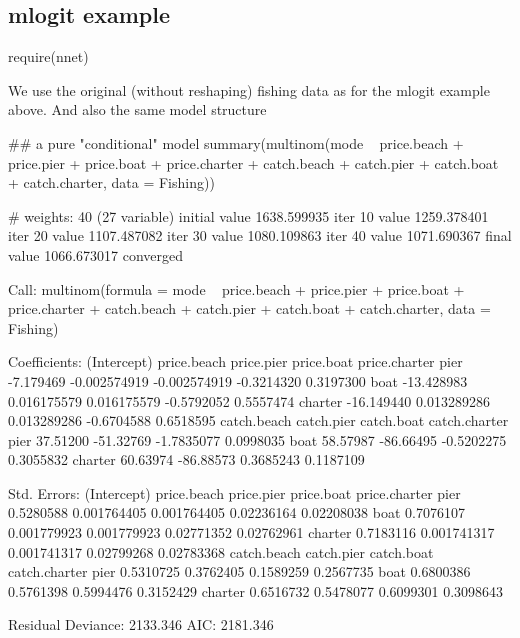\documentclass[a4paper,twoside]{tufte-book}\usepackage[]{graphicx}\usepackage[]{color}
\begin{document}
\begin{appendices}
\subsection{mlogit example}

\begin{Schunk}
\begin{Sinput}
require(nnet)
\end{Sinput}
\end{Schunk}

We use the original (without reshaping) fishing data as for the mlogit example above. 
And also the same model structure

\begin{Schunk}
\begin{Sinput}
## a pure "conditional" model
summary(multinom(mode ~ price.beach + price.pier + price.boat + price.charter + 
                   catch.beach + catch.pier + catch.boat + catch.charter, data = Fishing))
\end{Sinput}
\begin{Soutput}
# weights:  40 (27 variable)
initial  value 1638.599935 
iter  10 value 1259.378401
iter  20 value 1107.487082
iter  30 value 1080.109863
iter  40 value 1071.690367
final  value 1066.673017 
converged
\end{Soutput}
\begin{Soutput}
Call:
multinom(formula = mode ~ price.beach + price.pier + price.boat + 
    price.charter + catch.beach + catch.pier + catch.boat + catch.charter, 
    data = Fishing)

Coefficients:
        (Intercept)  price.beach   price.pier price.boat price.charter
pier      -7.179469 -0.002574919 -0.002574919 -0.3214320     0.3197300
boat     -13.428983  0.016175579  0.016175579 -0.5792052     0.5557474
charter  -16.149440  0.013289286  0.013289286 -0.6704588     0.6518595
        catch.beach catch.pier catch.boat catch.charter
pier       37.51200  -51.32769 -1.7835077     0.0998035
boat       58.57987  -86.66495 -0.5202275     0.3055832
charter    60.63974  -86.88573  0.3685243     0.1187109

Std. Errors:
        (Intercept) price.beach  price.pier price.boat price.charter
pier      0.5280588 0.001764405 0.001764405 0.02236164    0.02208038
boat      0.7076107 0.001779923 0.001779923 0.02771352    0.02762961
charter   0.7183116 0.001741317 0.001741317 0.02799268    0.02783368
        catch.beach catch.pier catch.boat catch.charter
pier      0.5310725  0.3762405  0.1589259     0.2567735
boat      0.6800386  0.5761398  0.5994476     0.3152429
charter   0.6516732  0.5478077  0.6099301     0.3098643

Residual Deviance: 2133.346 
AIC: 2181.346 
\end{Soutput}
\end{Schunk}
\end{appendices}


 
\end{document}

